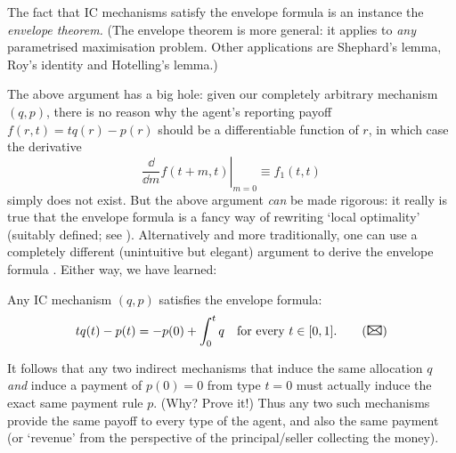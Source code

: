 The fact that IC mechanisms satisfy the envelope formula is an instance the \emph{envelope theorem.}
(The envelope theorem is more general: it applies to \emph{any} parametrised maximisation problem. Other applications are Shephard's lemma, Roy's identity and Hotelling's lemma.)


The above argument has a big hole: given our completely arbitrary mechanism $(q,p)$, there is no reason why the agent's reporting payoff $f(r,t) = t q(r) - p(r)$ should be a differentiable function of $r$, in which case the derivative
%
\begin{equation*}
	\left. \frac{\dd}{\dd m} f( t+m, t ) \right|_{m=0}
	\equiv f_1(t,t)
\end{equation*}
%
simply does not exist.
But the above argument \emph{can} be made rigorous: it really is true that the envelope formula is a fancy way of rewriting `local optimality' (suitably defined; see \textcite{Sinander2021}).
Alternatively and more traditionally,
one can use a completely different (unintuitive but elegant) argument to derive the envelope formula \parencite{MilgromSegal2002}.
Either way, we have learned:

\begin{namedthm}
	\label{proposition:ic_env}
	Any IC mechanism $(q,p)$ satisfies the envelope formula:
	\begin{equation*}
		t q(t) - p(t) = - p(0) + \int_0^t q
		\quad \text{for every $t \in [0,1]$.}
		\tag{{\Large\Letter}}
	\end{equation*}
\end{namedthm}


\begin{remark}
	\label{remark:rev_equivalence}
	It follows that any two indirect mechanisms
	that induce the same allocation $q$
	\emph{and} induce a payment of $p(0)=0$ from type $t=0$
	must actually induce the exact same payment rule $p$.
	(Why? Prove it!)
	Thus any two such mechanisms provide the same payoff to every type of the agent,
	and also the same payment (or `revenue' from the perspective of the principal/seller collecting the money).
\end{remark}


